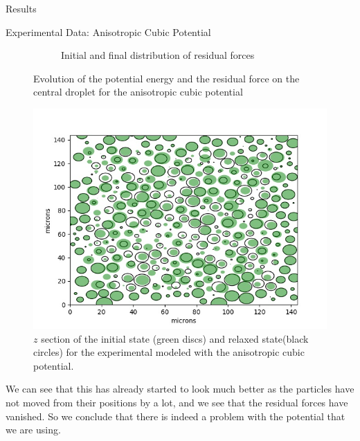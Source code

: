 \documentclass[12pt]{article}
\begin{document}
\begin{section}{Results}
\begin{subsection}{Experimental Data: Anisotropic Cubic Potential}
\begin{figure}[h!]
\begin{subfigure}{0.5\textwidth}
        \caption{Initial and final distribution of residual forces}
        \label{fig:sub2}
    \end{subfigure}
    \caption{Evolution of the potential energy and the residual force on the central droplet for the anisotropic cubic potential}
\end{figure}
\begin{figure}[h!]
    \centering
    \includegraphics[width=0.6\linewidth]{images/emulsion_cubic_anisotropic_cross_section.jpg}
    \caption{$z$ section of the initial state (green discs) and relaxed state(black circles) for the experimental modeled with the anisotropic cubic potential.}
    \label{fig:my_label}
\end{figure}
\par \noindent We can see that this has already started to look much better as the particles have not moved  from their positions by a lot, and we see that the residual forces have vanished. So we conclude that there is indeed a problem with the potential that we are using. 

\end{subsection}

\end{section}
\end{document}
